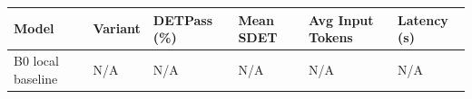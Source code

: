 \begin{tabular}{llllll}
\toprule
Model & Variant & DETPass (\%) & Mean SDET & Avg Input Tokens & Latency (s) \\
\midrule
B0 local baseline & N/A & N/A & N/A & N/A & N/A \\
\bottomrule
\end{tabular}
